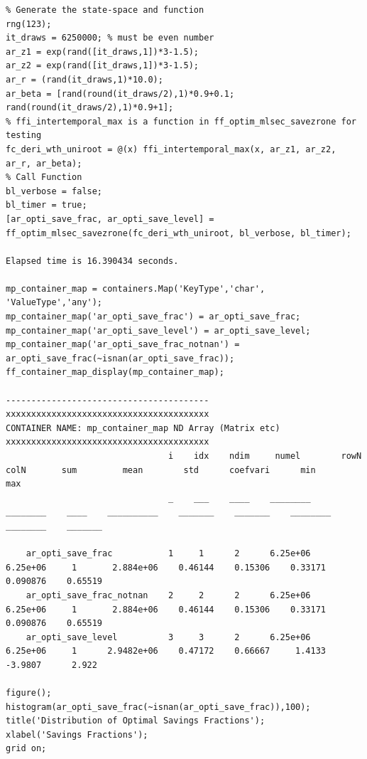 \documentclass[
]{book}
\begin{document}
\begin{verbatim}
% Generate the state-space and function
rng(123);
it_draws = 6250000; % must be even number
ar_z1 = exp(rand([it_draws,1])*3-1.5);
ar_z2 = exp(rand([it_draws,1])*3-1.5);
ar_r = (rand(it_draws,1)*10.0);
ar_beta = [rand(round(it_draws/2),1)*0.9+0.1; rand(round(it_draws/2),1)*0.9+1]; 
% ffi_intertemporal_max is a function in ff_optim_mlsec_savezrone for testing
fc_deri_wth_uniroot = @(x) ffi_intertemporal_max(x, ar_z1, ar_z2, ar_r, ar_beta);
% Call Function
bl_verbose = false;
bl_timer = true;
[ar_opti_save_frac, ar_opti_save_level] = ff_optim_mlsec_savezrone(fc_deri_wth_uniroot, bl_verbose, bl_timer);

Elapsed time is 16.390434 seconds.

mp_container_map = containers.Map('KeyType','char', 'ValueType','any');
mp_container_map('ar_opti_save_frac') = ar_opti_save_frac;
mp_container_map('ar_opti_save_level') = ar_opti_save_level;
mp_container_map('ar_opti_save_frac_notnan') = ar_opti_save_frac(~isnan(ar_opti_save_frac));
ff_container_map_display(mp_container_map);

----------------------------------------
xxxxxxxxxxxxxxxxxxxxxxxxxxxxxxxxxxxxxxxx
CONTAINER NAME: mp_container_map ND Array (Matrix etc)
xxxxxxxxxxxxxxxxxxxxxxxxxxxxxxxxxxxxxxxx
                                i    idx    ndim     numel        rowN      colN       sum         mean        std      coefvari      min         max  
                                _    ___    ____    ________    ________    ____    __________    _______    _______    ________    ________    _______

    ar_opti_save_frac           1     1      2      6.25e+06    6.25e+06     1       2.884e+06    0.46144    0.15306    0.33171     0.090876    0.65519
    ar_opti_save_frac_notnan    2     2      2      6.25e+06    6.25e+06     1       2.884e+06    0.46144    0.15306    0.33171     0.090876    0.65519
    ar_opti_save_level          3     3      2      6.25e+06    6.25e+06     1      2.9482e+06    0.47172    0.66667     1.4133      -3.9807      2.922

figure();
histogram(ar_opti_save_frac(~isnan(ar_opti_save_frac)),100);
title('Distribution of Optimal Savings Fractions');
xlabel('Savings Fractions');
grid on;
\end{verbatim}
\end{document}
